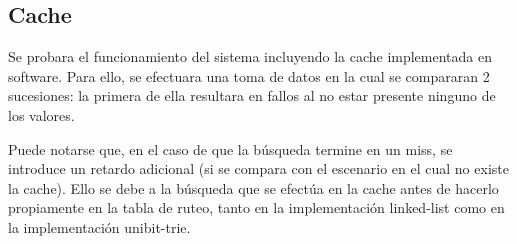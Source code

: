 \newpage
\subsection{Cache}

Se probara el funcionamiento del sistema incluyendo la cache implementada en software. Para ello, se efectuara una toma de datos en la cual se compararan 2 sucesiones: la primera de ella resultara en fallos al no estar presente ninguno de los valores.

Puede notarse que, en el caso de que la búsqueda termine en un miss, se introduce un retardo adicional (si se compara con el escenario en el cual no existe la cache). Ello se debe a la búsqueda que se efectúa en la cache antes de hacerlo propiamente en la tabla de ruteo, tanto en la implementación linked-list como en la implementación unibit-trie.

